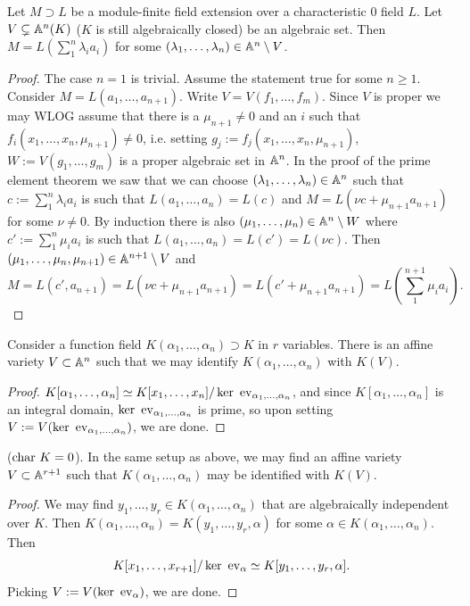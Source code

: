         \begin{proposition}
            Let $M\supset L$ be a module-finite field extension over a characteristic $0$ field $L$. Let $V\subsetneq \mathbb{A}^n(K)$ ($K$ is still algebraically closed) be an algebraic set. Then $M=L\left(\sum_1^n \lambda_ia_i\right)$ for some $(\lambda_1,\dots,\lambda_n)\in \mathbb{A}^n\setminus V$. 
        \end{proposition}
        \begin{proof}
            The case $n=1$ is trivial. Assume the statement true for some $n\geq 1$. Consider $M=L(a_1,\dots,a_{n+1})$. Write $V=V(f_1,\dots,f_m)$. Since $V$ is proper we may WLOG assume that there is a $\mu_{n+1}\neq 0$ and an $i$ such that $f_i(x_1,\dots,x_n,\mu_{n+1})\neq0$, i.e. setting $g_j:= f_j(x_1,\dots,x_n,\mu_{n+1})$, $W:= V(g_1,\dots,g_m)$ is a proper algebraic set in $\mathbb{A}^n$. In the proof of the prime element theorem we saw that we can choose $(\lambda_1,\dots,\lambda_n)\in \mathbb{A}^n$ such that $c:=\sum_1^n \lambda_ia_i$ is such that $L(a_1,\dots,a_n)=L(c)$ and $M=L(\nu c+\mu_{n+1} a_{n+1})$ for some $\nu \neq 0$. By induction there is also $(\mu_1,\dots,\mu_n)\in \mathbb{A}^n\setminus W$ where $c':=\sum_1^n \mu_ia_i$ is such that $L(a_1,\dots,a_n)=L(c')=L(\nu c)$. Then $(\mu_1,\dots,\mu_n,\mu_{n+1})\in \mathbb{A}^{n+1}\setminus V$ and $$M=L(c',a_{n+1})=L(\nu c+\mu_{n+1} a_{n+1})=L(c'+\mu_{n+1} a_{n+1})=L\left(\sum_1^{n+1} \mu_ia_i\right).$$ 
        \end{proof}
        \begin{proposition}
            Consider a function field $K(\alpha_1,\dots,\alpha_n)\supset K$ in $r$ variables. There is an affine variety $V\subset \mathbb{A}^n$ such that we may identify $K(\alpha_1,\dots,\alpha_n)$ with $K(V)$.
        \end{proposition}
        \begin{proof}
            $K[\alpha_1,\dots,\alpha_n]\simeq K[x_1,\dots,x_n]/\ker \ \mathrm{ev}_{\alpha_1,\dots,\alpha_n}$, and since $K[\alpha_1,\dots,\alpha_n]$ is an integral domain, $\ker\ \ev_{\alpha_1,\dots,\alpha_n}$ is prime, so upon setting $V:=V(\ker \ \mathrm{ev}_{\alpha_1,\dots,\alpha_n})$, we are done. 
        \end{proof}
        \begin{proposition}\label{WeMayIdentifyAFuntionFieldWithFunctionFieldOverVariety}
            ($\mathrm{char} \ K=0$). In the same setup as above, we may find an affine variety $V\subset \mathbb{A}^{r+1}$ such that $K(\alpha_1,\dots,\alpha_n)$ may be identified with $K(V)$.
        \end{proposition}
        \begin{proof}
            We may find $y_1,\dots,y_r\in K(\alpha_1,\dots,\alpha_n)$ that are algebraically independent over $K$. Then $K(\alpha_1,\dots,\alpha_n)=K(y_1,\dots,y_r,\alpha)$ for some $\alpha\in K(\alpha_1,\dots,\alpha_n)$. Then 
            $$K[x_1,\dots,x_{r+1}]/\ker\ \mathrm{ev}_\alpha \simeq K[y_1,\dots,y_r,\alpha].$$
             Picking $V := V(\ker \ \mathrm{ev}_\alpha)$, we are done.
        \end{proof}

